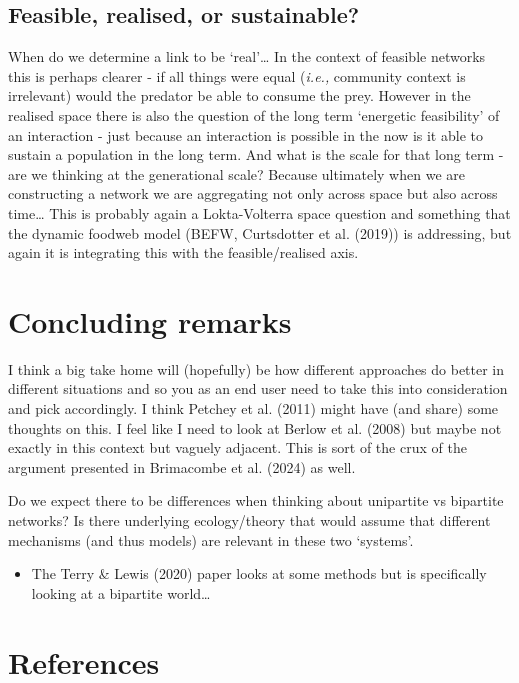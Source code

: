 \documentclass[
]{article}
\providecommand{\tightlist}{%
  \setlength{\itemsep}{0pt}\setlength{\parskip}{0pt}}\usepackage{longtable,booktabs,array}
\begin{document}
\subsection{Feasible, realised, or
sustainable?}\label{feasible-realised-or-sustainable}

When do we determine a link to be `real'\ldots{} In the context of
feasible networks this is perhaps clearer - if all things were equal
(\emph{i.e.,} community context is irrelevant) would the predator be
able to consume the prey. However in the realised space there is also
the question of the long term `energetic feasibility' of an interaction
- just because an interaction is possible in the now is it able to
sustain a population in the long term. And what is the scale for that
long term - are we thinking at the generational scale? Because
ultimately when we are constructing a network we are aggregating not
only across space but also across time\ldots{} This is probably again a
Lokta-Volterra space question and something that the dynamic foodweb
model (BEFW, Curtsdotter et al. (2019)) is addressing, but again it is
integrating this with the feasible/realised axis.

\section{Concluding remarks}\label{concluding-remarks}

I think a big take home will (hopefully) be how different approaches do
better in different situations and so you as an end user need to take
this into consideration and pick accordingly. I think Petchey et al.
(2011) might have (and share) some thoughts on this. I feel like I need
to look at Berlow et al. (2008) but maybe not exactly in this context
but vaguely adjacent. This is sort of the crux of the argument presented
in Brimacombe et al. (2024) as well.

Do we expect there to be differences when thinking about unipartite vs
bipartite networks? Is there underlying ecology/theory that would assume
that different mechanisms (and thus models) are relevant in these two
`systems'.

\begin{itemize}
\tightlist
\item
  The Terry \& Lewis (2020) paper looks at some methods but is
  specifically looking at a bipartite world\ldots{}
\end{itemize}

\section*{References}\label{references}
\end{document}
